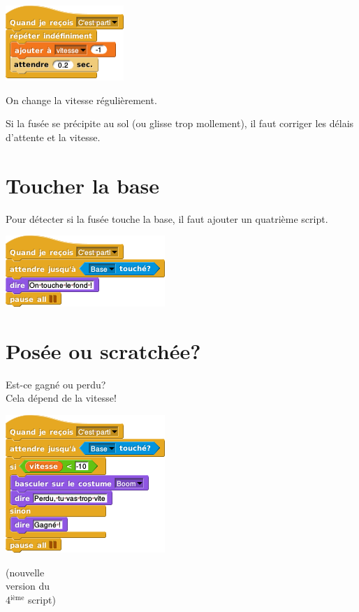 \documentclass[a7paper,pagesize,DIV=14,10pt]{scrbook}
\begin{document}
\begin{minipage}{.5\linewidth}
  \includegraphics[scale=.5]{img/fusee_tomber-plus-vite.png}
\end{minipage}
\begin{minipage}{.5\linewidth}
  On change la vitesse régulièrement.
\end{minipage}

Si la fusée se précipite au sol (ou glisse trop mollement), il faut corriger les
délais d'attente et la vitesse.

\newpage
\section*{Toucher la base}
\vspace{-.7\baselineskip}

Pour détecter si la fusée touche la base, il faut ajouter un quatrième script.

\includegraphics[scale=.5]{img/fusee_touche-fond.png}

\vspace{-.7\baselineskip}
\section*{Posée ou scratchée?}
\vspace{-.7\baselineskip}
Est-ce gagné ou perdu? \\
Cela dépend de la vitesse!

\begin{minipage}{.65\linewidth}
\includegraphics[scale=.5]{img/fusee_fin-base.png}
\end{minipage}
\begin{minipage}{.34\linewidth}
  (nouvelle \\
  version du\\ 
  4$^\text{ième}$ script)
\end{minipage}
\end{document}
